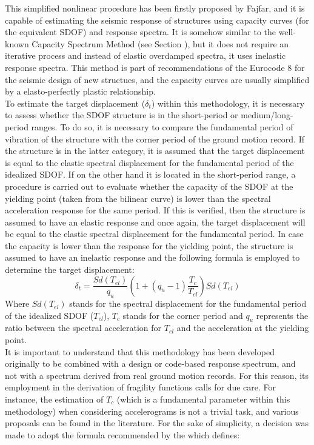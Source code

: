 This simplified nonlinear procedure has been firstly proposed by Fajfar, and it is capable of estimating the seismic response of structures using capacity curves (for the equivalent SDOF) and response spectra. It is somehow similar to the well-known Capacity Spectrum Method (see Section ), but it does not require an iterative process and instead of elastic overdamped spectra, it uses inelastic response spectra. This method is part of recommendations of the Eurocode 8 \citep{CEN2005} for the seismic design of new structues, and the capacity curves are usually simplified by a elasto-perfectly plastic relationship.\\
To estimate the target displacement ($\delta_t$) within this methodology, it is necessary to assess whether the SDOF structure is in the short-period or medium/long-period ranges. To do so, it is necessary to compare the fundamental period of vibration of the structure with the corner period of the ground motion record. If the structure is in the latter category, it is assumed that the target displacement is equal to the elastic spectral displacement for the fundamental period of the idealized SDOF. If on the other hand it is located in the short-period range, a procedure is carried out to evaluate whether the capacity of the SDOF at the yielding point (taken from the bilinear curve) is lower than the spectral acceleration response for the same period. If this is verified, then the structure is assumed to have an elastic response and once again, the target displacement will be equal to the elastic spectral displacement for the fundamental period. In case the capacity is lower than the response for the yielding point, the structure is assumed to have an inelastic response and the following formula is employed to determine the target displacement:
\begin{equation}
\delta_t = \frac{Sd(T_{el})}{q_u}\left(1+(q_u-1)\frac{T_c}{T_{el}}\right)Sd(T_{el})
\end{equation}
Where $Sd(T_{el})$ stands for the spectral displacement for the fundamental period of the idealized SDOF ($T_{el}$), $T_c$ stands for the corner period and $q_u$ represents the ratio between the spectral acceleration for $T_{el}$ and the acceleration at the yielding point.\\

It is important to understand that this methodology has been developed originally to be combined with a design or code-based response spectrum, and not with a spectrum derived from real ground motion records. For this reason, its employment in the derivation of fragility functions calls for due care. For instance, the estimation of $T_c$ (which is a fundamental parameter within this methodology) when considering accelerograms is not a trivial task, and various proposals can be found in the literature. For the sake of simplicity, a decision was made to adopt the formula recommended by the \cite{ASCE2010} which defines:


